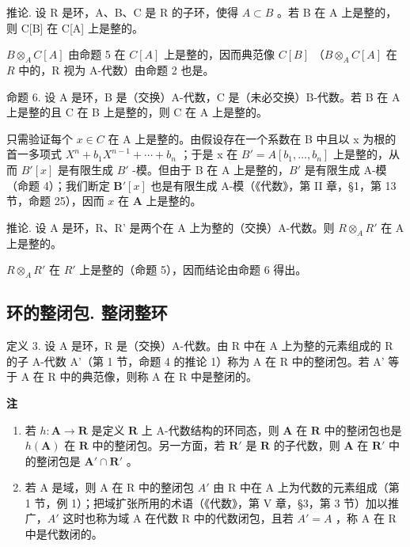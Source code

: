 推论. 设 R 是环，A、B、C 是 R 的子环，使得 \(A \subset B\) 。若 B 在 A 上是整的，则 C{[}B{]} 在 C{[}A{]} 上是整的。

\(B \otimes_{A} C[A]\) 由命题 5 在 \(C[A]\) 上是整的，因而典范像 \(C[B]\) （\(B \otimes_{A} C[A]\) 在 \(R\) 中的，R 视为 A-代数）由命题 2 也是。

命题 6. 设 A 是环，B 是（交换）A-代数，C 是（未必交换）B-代数。若 B 在 A 上是整的且 C 在 B 上是整的，则 C 在 A 上是整的。

只需验证每个 \(x \in C\) 在 A 上是整的。由假设存在一个系数在 B 中且以 x 为根的首一多项式 \(X^{n} + b_{1}X^{n-1} + \cdots + b_{n}\) ；于是 x 在 \(B' = A[b_{1}, \ldots, b_{n}]\) 上是整的，从而 \(B'[x]\) 是有限生成 \(B'\) -模。但由于 B 在 A 上是整的，\(B'\) 是有限生成 A-模（命题 4）；我们断定 \(\mathbf{B}'[x]\) 也是有限生成 A-模（《代数》，第 II 章，§1，第 13 节，命题 25），因而 \(x\) 在 \(\mathbf{A}\) 上是整的。

推论. 设 A 是环，R、R' 是两个在 A 上为整的（交换）A-代数。则 \(R \otimes_{A} R'\) 在 A 上是整的。

\(R \otimes_{A} R'\) 在 \(R'\) 上是整的（命题 5），因而结论由命题 6 得出。

\subsection{环的整闭包. 整闭整环}

定义 3. 设 A 是环，R 是（交换）A-代数。由 R 中在 A 上为整的元素组成的 R 的子 A-代数 A'（第 1 节，命题 4 的推论 1）称为 A 在 R 中的整闭包。若 A' 等于 A 在 R 中的典范像，则称 A 在 R 中是整闭的。

\textbf{注}\par

\begin{enumerate}
\def\labelenumi{(\arabic{enumi})}
\item
  若 \(h: \mathbf{A} \to \mathbf{R}\) 是定义 \(\mathbf{R}\) 上 A-代数结构的环同态，则 \(\mathbf{A}\) 在 \(\mathbf{R}\) 中的整闭包也是 \(h(\mathbf{A})\) 在 \(\mathbf{R}\) 中的整闭包。另一方面，若 \(\mathbf{R}'\) 是 \(\mathbf{R}\) 的子代数，则 \(\mathbf{A}\) 在 \(\mathbf{R}'\) 中的整闭包是 \(\mathbf{A}' \cap \mathbf{R}'\) 。
\item
  若 A 是域，则 A 在 R 中的整闭包 \(A'\) 由 R 中在 A 上为代数的元素组成（第 1 节，例 1）；把域扩张所用的术语（《代数》，第 V 章，§3，第 3 节）加以推广，\(A'\) 这时也称为域 A 在代数 R 中的代数闭包，且若 \(A' = A\) ，称 A 在 R 中是代数闭的。
\end{enumerate}

